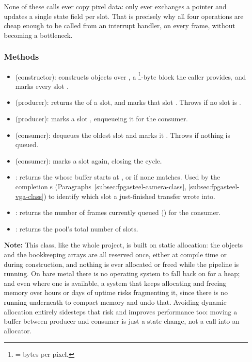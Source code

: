 None of these calls ever copy pixel data:  only ever exchanges a pointer and updates a single state field per slot. That is precisely why all four operations are cheap enough to be called from an interrupt handler, on every frame, without becoming a bottleneck.

\subsubsection{Methods}

\begin{itemize}
    \item {} (constructor): constructs   objects over , a \footnote{ = bytes per pixel.}-byte block the caller provides, and marks every slot .
    \item {} (producer): returns the  of a  slot, and marks that slot . Throws  if no slot is .
    \item {} (producer): marks a  slot , enqueueing it for the consumer.
    \item {} (consumer): dequeues the oldest  slot and marks it . Throws  if nothing is queued.
    \item {} (consumer): marks a  slot  again, closing the cycle.
    \item {}: returns the  whose buffer starts at , or  if none matches. Used by the  completion s (Paragraphs~\ref{subsec:fpgasteel-camera-class}, \ref{subsec:fpgasteel-vga-class}) to identify which slot a just-finished transfer wrote into.
    \item {}: returns the number of frames currently queued () for the consumer.
    \item {}: returns the pool's total number of slots.
\end{itemize}

\textbf{Note:} This class, like the whole project, is built on static allocation: the  objects and the bookkeeping arrays are all reserved once, either at compile time or during construction, and nothing is ever allocated or freed while the pipeline is running. On bare metal there is no operating system to fall back on for a heap; and even where one is available, a system that keeps allocating and freeing memory over hours or days of uptime risks fragmenting it, since there is no  running underneath to compact memory and undo that. Avoiding dynamic allocation entirely sidesteps that risk and improves performance too: moving a buffer between producer and consumer is just a state change, not a call into an allocator.

